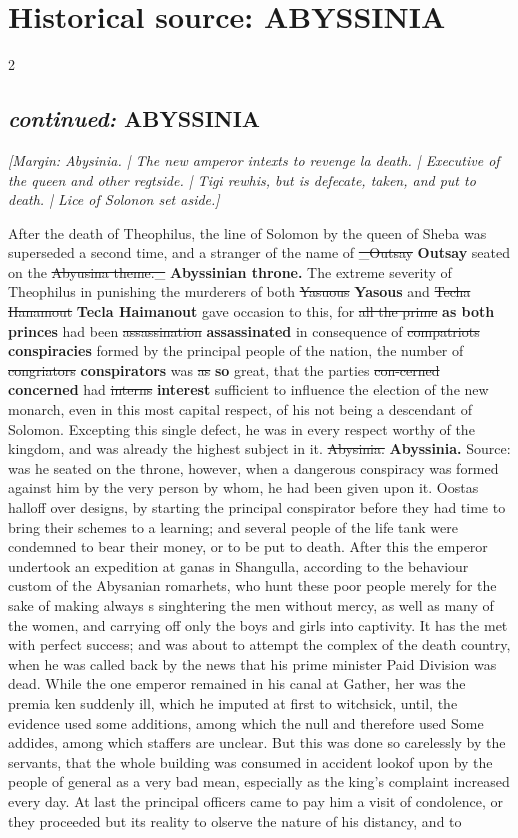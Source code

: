 \documentclass[10pt]{article}
\begin{document}
\section*{Historical source: ABYSSINIA}
\begin{multicols}{2}
\subsection*{\textit{continued:} ABYSSINIA}
{\small\itshape [Margin: Abysinia. | The new amperor intexts to revenge la death. | Executive of the queen and other regtside. | Tigi rewhis, but is defecate, taken, and put to death. | Lice of Solonon set aside.]}\par
After the death of Theophilus, the line of Solomon by the queen of Sheba was superseded a second time, and a stranger of the name of \sout{\_Outsay} \textbf{Outsay} seated on the \sout{Abyusina theme.\_} \textbf{Abyssinian throne.} The extreme severity of Theophilus in punishing the murderers of both \sout{Yasuous} \textbf{Yasous} and \sout{Techa Hanamout} \textbf{Tecla Haimanout} gave occasion to this, for \sout{all the prime} \textbf{as both princes} had been \sout{assassination} \textbf{assassinated} in consequence of \sout{compatriots} \textbf{conspiracies} formed by the principal people of the nation, the number of \sout{congriators} \textbf{conspirators} was \sout{as} \textbf{so} great, that the parties \sout{con-cerned} \textbf{concerned} had \sout{interns} \textbf{interest} sufficient to influence the election of the new monarch, even in this most capital respect, of his not being a descendant of Solomon. Excepting this single defect, he was in every respect worthy of the kingdom, and was already the highest subject in it. \sout{Abysinia.} \textbf{Abyssinia.} Source: was he seated on the throne, however, when a dangerous conspiracy was formed against him by the very person by whom, he had been given upon it. Oostas halloff over designs, by starting the principal conspirator before they had time to bring their schemes to a learning; and several people of the life tank were condemned to bear their money, or to be put to death. After this the emperor undertook an expedition at ganas in Shangulla, according to the behaviour custom of the Abysanian romarhets, who hunt these poor people merely for the sake of making always s singhtering the men without mercy, as well as many of the women, and carrying off only the boys and girls into captivity. It has the met with perfect success; and was about to attempt the complex of the death country, when he was called back by the news that his prime minister Paid Division was dead. While the one emperor remained in his canal at Gather, her was the premia ken suddenly ill, which he imputed at first to witchsick, until, the evidence used some additions, among which the null and therefore used Some addides, among which staffers are unclear. But this was done so carelessly by the servants, that the whole building was consumed in accident lookof upon by the people of general as a very bad mean, especially as the king's complaint increased every day. At last the principal officers came to pay him a visit of condolence, or they proceeded but its reality to olserve the nature of his distancy, and to 
\end{multicols}
\end{document}
